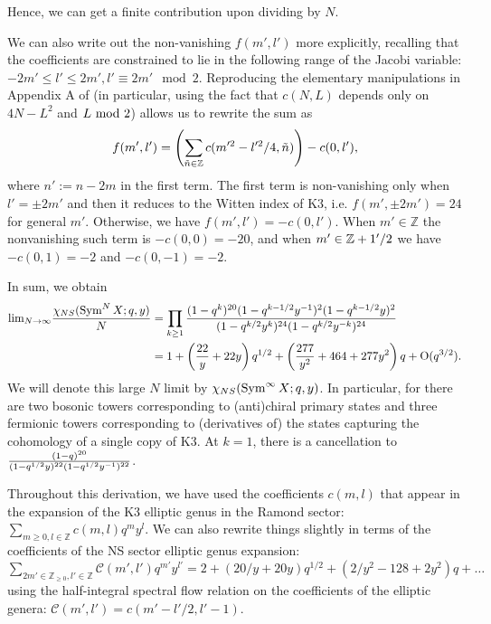 \documentclass[../main.tex]{subfiles}
\begin{document}
Hence, we can get a finite contribution upon dividing by $N$. 

We can also write out the non-vanishing $f(m', l')$ more explicitly, recalling that the coefficients are constrained to lie in the following range of the Jacobi variable: $-2m' \leq l' \leq 2m', l' \equiv 2 m' \mod 2$. Reproducing the elementary manipulations in Appendix A of \cite{BKKP} (in particular, using the fact that $c(N, L)$ depends only on $4N-L^2$ and $L \ {\rm mod} \ 2$) allows us to rewrite the sum as
\begin{equation}\label{eq:fml1}
f(m', l') = \left( \sum_{\tilde{n} \in \mathbb Z}c(m'^2 - l'^2/4, \tilde{n}) \right) - c(0, l'),
\end{equation} where $n':= n - 2m$ in the first term. 
The first term is non-vanishing only when $l' = \pm 2 m'$ and then it reduces to the Witten index of K3, i.e. $f(m', \pm 2m') = 24$ for general $m'$. Otherwise, we have $f(m', l') = -c(0, l')$. When $m' \in \mathbb{Z}$ the nonvanishing such term is $-c(0, 0) = -20$, and when $m' \in \mathbb Z + 1'/2$ we have $-c(0, 1) = -2$ and $-c(0, -1) = -2$. 

In sum, we obtain
\begin{align*}
{\rm lim}_{N \rightarrow \infty}{\chi_{NS}(\operatorname{Sym}^{N} X; q, y) \over N} &= \prod_{k \geq 1}{(1 - q^k)^{20}(1 - q^{k-1/2}y^{-1})^2(1 - q^{k-1/2}y)^2 \over (1 - q^{k/2}y^k)^{24}(1 - q^{k/2}y^{-k})^{24}} \\
&= 1 + \left({22 \over y} + 22 y \right)q^{1/2} + \left({277 \over y^2} + 464 + 277 y^2 \right)q + \text{O}(q^{3/2}).
\end{align*} 
We will denote this large $N$ limit by $\chi_{NS}(\operatorname{Sym}^\infty X ; q,y)$. 
In particular, for there are two bosonic towers corresponding to (anti)chiral primary states and three fermionic towers corresponding to (derivatives of) the states capturing the cohomology of a single copy of K3. At $k=1$, there is a cancellation to ${(1 - q)^{20} \over (1 - q^{1/2}y)^{22}(1 - q^{1/2}y^{-1})^{22}}$.

Throughout this derivation, we have used the coefficients $c(m, l)$ that appear in the expansion of the K3 elliptic genus in the Ramond sector: $\sum_{m \geq 0, l \in \mathbb{Z}} c(m, l) q^m y^l$. We can also rewrite things slightly in terms of the coefficients of the NS sector elliptic genus expansion: $\sum_{2 m' \in \mathbb{Z}_{\geq 0}, l' \in \mathbb{Z}} \mathcal{C}(m', l') q^{m'} y^{l'} = 2 + (20/y + 20 y)q^{1/2} + (2/y^2 - 128 + 2 y^2)q + \ldots$ using the half-integral spectral flow relation on the coefficients of the elliptic genera: $\mathcal{C}(m', l') = c(m'-l'/2, l'-1)$. 
\end{document}
